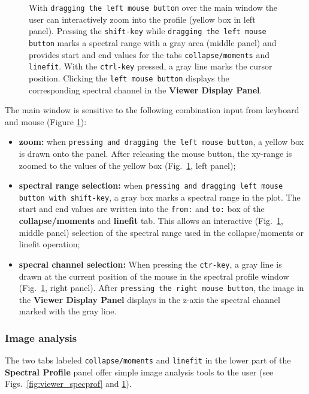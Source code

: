 \begin{figure}[h!]
\begin{center}
\caption{\label{fig:viewer_specmouse}With {\tt dragging the left mouse button}
over the main window the user can interactively zoom into the profile
(yellow box in left panel). Pressing the {\tt shift-key} while {\tt dragging the left mouse button}
marks a spectral range with a gray area (middle panel) and provides
start and end values for the tabs {\tt collapse/moments} and {\tt linefit}. With the
{\tt ctrl-key} pressed, a gray line marks the cursor position. Clicking the {\tt left mouse button}
displays the corresponding spectral channel in the {\bf Viewer Display Panel}.}
\hrulefill
\end{center}
\end{figure}
The main window is sensitive to the following combination input from keyboard
and mouse (Figure \ref{fig:viewer_specmouse}):
\begin{itemize}
\item {\bf zoom:} when {\tt pressing and dragging the left mouse button}, a
yellow box is drawn onto the panel. After releasing the mouse button,
the xy-range is zoomed to the values of the yellow box
(Fig.~\ref{fig:viewer_specmouse}, left panel);
\item {\bf spectral range selection:} when {\tt pressing and dragging left 
mouse button with shift-key}, a gray box marks a spectral range in the plot.
The start and end values are written into the {\tt from:} and {\tt to:} box
of the {\bf collapse/moments} and {\bf linefit} tab. 
This allows an interactive (Fig.~\ref{fig:viewer_specmouse}, middle panel)
selection of the spectral range used in the collapse/moments or linefit operation;
\item {\bf specral channel selection:} When pressing the {\tt ctr-key}, a gray
line is drawn at the current position of the mouse in the spectral profile
window (Fig.~\ref{fig:viewer_specmouse}, right panel). After
{\tt pressing the right mouse button}, the image in the {\bf Viewer Display Panel}
displays in the z-axis the spectral channel marked with the gray line.
\end{itemize}

\subsubsection{Image analysis}
\label{section:display.image.specprof.analysis}
The two tabs labeled {\tt collapse/moments} and {\tt linefit} in the lower
part of the {\bf Spectral Profile} panel offer simple image analysis tools to
the user (see Figs.~\ref{fig:viewer_specprof} and \ref{fig:viewer_specmouse}).

